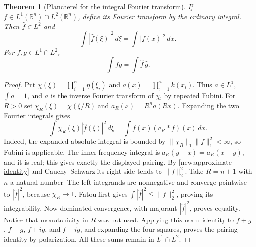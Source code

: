 \documentclass[11pt]{article}
\newtheorem{theorem}{Theorem}[section]
\theoremstyle{definition}
\newcommand{\R}{\mathbb R}
\begin{document}
\begin{theorem}[Plancherel for the integral Fourier transform]\label{new:integral-plancherel}
If $f\in L^1(\R^n)\cap L^2(\R^n)$, define its Fourier transform by the ordinary integral.
Then $\widehat f\in L^2$ and
\[
 \int|\widehat f(\xi)|^2\,d\xi=\int|f(x)|^2\,dx.
\]
For $f,g\in L^1\cap L^2$,
\[
 \int f\overline g=\int\widehat f\,\overline{\widehat g}.
\]
\end{theorem}
\begin{proof}
Put $\chi(\xi)=\prod_{i=1}^n\eta(\xi_i)$ and
$a(x)=\prod_{i=1}^nk(x_i)$. Thus $a\in L^1$, $\int a=1$, and $a$ is the inverse Fourier
transform of $\chi$, by repeated Fubini. For $R>0$ set $\chi_R(\xi)=\chi(\xi/R)$ and
$a_R(x)=R^na(Rx)$. Expanding the two Fourier integrals gives
\[
 \int\chi_R(\xi)|\widehat f(\xi)|^2\,d\xi
 =\int f(x)\overline{(a_R*f)(x)}\,dx.
\]
Indeed, the expanded absolute integral is bounded by
$\|\chi_R\|_1\|f\|_1^2<\infty$, so Fubini is applicable. The inner frequency integral is
$a_R(y-x)=a_R(x-y)$, and it is real; this gives exactly the displayed pairing.
By \cref{new:approximate-identity} and Cauchy--Schwarz its right side tends to $\|f\|_2^2$.
Take $R=n+1$ with $n$ a natural number. The left integrands are nonnegative and converge
pointwise to $|\widehat f|^2$, because
$\chi_R\to1$. Fatou first gives $\int|\widehat f|^2\leq\|f\|_2^2$, proving its integrability.
Now dominated convergence, with majorant $|\widehat f|^2$, proves equality. Notice that
monotonicity in $R$ was not used. Applying this norm identity to $f+g$, $f-g$, $f+ig$,
and $f-ig$, and expanding the four squares, proves the pairing identity by polarization.
All these sums remain in $L^1\cap L^2$.
\end{proof}
\end{document}
